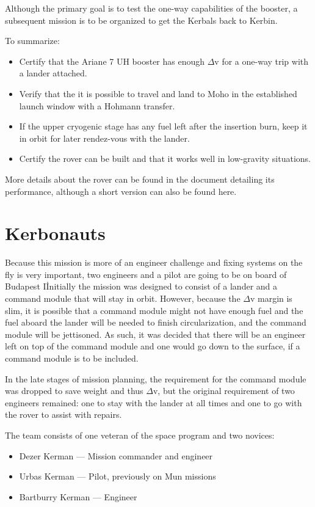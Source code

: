 \documentclass[11pt, a4paper]{article}
\newcommand{\missionname}{Budapest I}
\begin{document}
Although the primary goal is to test the one-way capabilities of the
booster, a subsequent mission is to be organized to get the Kerbals
back to Kerbin.

To summarize:
\begin{itemize}
\item Certify that the Ariane 7 UH booster has enough $\Delta$v for a
  one-way trip with a lander attached.
\item Verify that the it is possible to travel and land to Moho in the
  established launch window with a Hohmann transfer.
\item If the upper cryogenic stage has any fuel left after the
  insertion burn, keep it in orbit for later rendez-vous with the lander.
\item Certify the rover can be built and that it works well in
  low-gravity situations.
\end{itemize}

More details about the rover can be found in the document detailing
its performance, although a short version can also be found here.

\section{Kerbonauts}
Because this mission is more of an engineer challenge and fixing
systems on the fly is very important, two engineers and a pilot are
going to be on board of \missionname\. Initially the mission was
designed to consist of a lander and a command module that will stay in
orbit. However, because the $\Delta$v margin is slim, it is possible
that a command module might not have enough fuel and the fuel aboard
the lander will be needed to finish circularization, and the command
module will be jettisoned. As such, it was decided that there will be
an engineer left on top of the command module and one would go down to
the surface, if a command module is to be included.

In the late stages of mission planning, the requirement for the
command module was dropped to save weight and thus $\Delta$v, but the
original requirement of two engineers remained: one to stay with the
lander at all times and one to go with the rover to assist with
repairs.

The team consists of one veteran of the space program and two novices:
\begin{itemize}
\item Dezer Kerman — Mission commander and engineer
\item Urbas Kerman — Pilot, previously on Mun missions
\item Bartburry Kerman — Engineer
\end{itemize}
\end{document}
